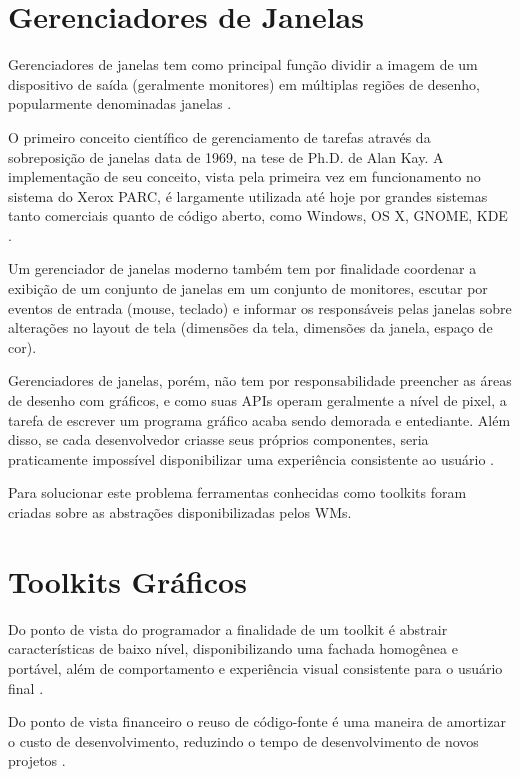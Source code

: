\section{Gerenciadores de Janelas}

Gerenciadores de janelas tem como principal função dividir a imagem de um
dispositivo de saída (geralmente monitores) em múltiplas regiões de desenho,
popularmente denominadas janelas \cite[p. 5]{myers1996uimss}.

O primeiro conceito científico de gerenciamento de tarefas através da
sobreposição de janelas data de 1969, na tese de Ph.D. de Alan Kay. A
implementação de seu conceito, vista pela primeira vez em funcionamento no
sistema do Xerox PARC, é largamente utilizada até hoje por grandes sistemas
tanto comerciais quanto de código aberto, como Windows, OS X, GNOME, KDE
\cite[p. 7]{myers2000past}.

Um gerenciador de janelas moderno também tem por finalidade coordenar a exibição
de um conjunto de janelas em um conjunto de monitores, escutar por eventos de
entrada (mouse, teclado) e informar os responsáveis pelas janelas sobre
alterações no layout de tela (dimensões da tela, dimensões da janela, espaço de
cor).

Gerenciadores de janelas, porém, não tem por responsabilidade preencher as áreas
de desenho com gráficos, e como suas APIs operam geralmente a nível de pixel, a
tarefa de escrever um programa gráfico acaba sendo demorada e entediante. Além
disso, se cada desenvolvedor criasse seus próprios componentes, seria
praticamente impossível disponibilizar uma experiência consistente ao usuário
.

Para solucionar este problema ferramentas conhecidas como toolkits foram criadas
sobre as abstrações disponibilizadas pelos WMs.

\section{Toolkits Gráficos}

Do ponto de vista do programador a finalidade de um toolkit é abstrair
características de baixo nível, disponibilizando uma fachada homogênea e
portável, além de comportamento e experiência visual consistente para o usuário
final \cite{myers2000past}.

Do ponto de vista financeiro o reuso de código-fonte é uma maneira de amortizar
o custo de desenvolvimento, reduzindo o tempo de desenvolvimento de novos
projetos .

